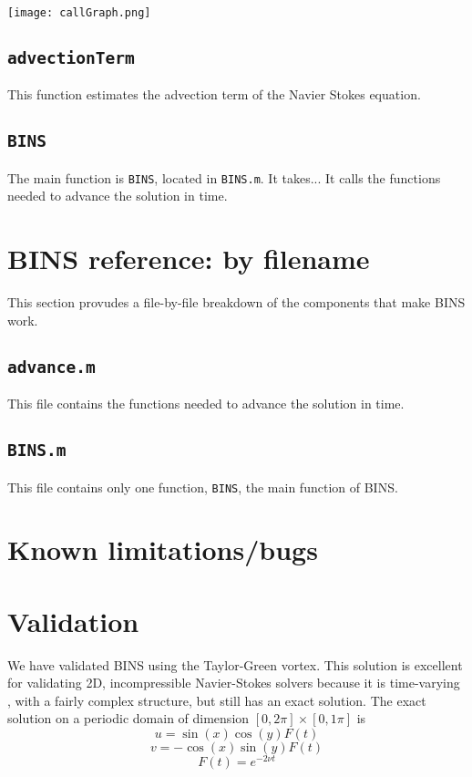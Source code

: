 \documentclass[12pt]{article}
\begin{document}
\texttt{[image: callGraph.png]} 

\subsection{\texttt{advectionTerm}}
This function estimates the advection term of the Navier Stokes equation.

\subsection{\texttt{BINS}}
The main function is \texttt{BINS}, located in \texttt{BINS.m}.  It takes...  It calls the functions needed to advance the solution in time.

\section{BINS reference: by filename}
This section provudes a file-by-file breakdown of the components that make BINS work.

\subsection{\texttt{advance.m}}
This file contains the functions needed to advance the solution in time.

\subsection{\texttt{BINS.m}}
This file contains only one function, \texttt{BINS}, the main function of BINS.

\section{Known limitations/bugs}


\section{Validation}
We have validated BINS using the Taylor-Green vortex.  This solution is excellent for validating 2D, incompressible Navier-Stokes solvers because it is time-varying , with a fairly complex structure, but still has an exact solution.  
The exact solution on a periodic domain of dimension $[0,2\pi] \times [0,1\pi]$ is
\[ u=\sin (x) \cos (y) F(t)\]
\[ v=-\cos (x) \sin (y) F(t)\]
\[ F(t)=e^{-2\nu t}\]
\end{document}
